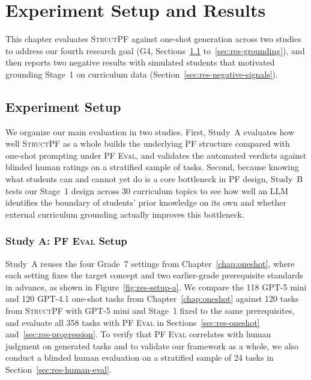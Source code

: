 \chapter{Experiment Setup and Results}
\label{chap:results}

This chapter evaluates \textsc{StructPF} against one-shot generation across two studies to address our fourth research goal (G4, Sections~\ref{sec:res-setup} to~\ref{sec:res-grounding}), and then reports two negative results with simulated students that motivated grounding Stage~1 on curriculum data (Section~\ref{sec:res-negative-signals}).

\section{Experiment Setup}
\label{sec:res-setup}

We organize our main evaluation in two studies. First, Study~A evaluates how well \textsc{StructPF} as a whole builds the underlying PF structure compared with one-shot prompting under \textsc{PF Eval}, and validates the automated verdicts against blinded human ratings on a stratified sample of tasks. Second, because knowing what students can and cannot yet do is a core bottleneck in PF design, Study~B tests our Stage~1 design across 30 curriculum topics to see how well an LLM identifies the boundary of students' prior knowledge on its own and whether external curriculum grounding actually improves this bottleneck.

\subsection{Study A: \textsc{PF Eval} Setup}
\label{subsec:res-setup-a}

Study~A reuses the four Grade~7 settings from Chapter~\ref{chap:oneshot}, where each setting fixes the target concept and two earlier-grade prerequisite standards in advance, as shown in Figure~\ref{fig:res-setup-a}. We compare the 118 GPT-5 mini and 120 GPT-4.1 one-shot tasks from Chapter~\ref{chap:oneshot} against 120 tasks from \textsc{StructPF} with GPT-5 mini and Stage~1 fixed to the same prerequisites, and evaluate all 358 tasks with \textsc{PF Eval} in Sections~\ref{sec:res-oneshot} and~\ref{sec:res-progression}. To verify that \textsc{PF Eval} correlates with human judgment on generated tasks and to validate our framework as a whole, we also conduct a blinded human evaluation on a stratified sample of 24 tasks in Section~\ref{sec:res-human-eval}.

